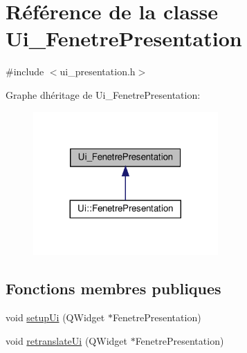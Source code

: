 \hypertarget{class_ui___fenetre_presentation}{}\section{Référence de la classe Ui\+\_\+\+Fenetre\+Presentation}
\label{class_ui___fenetre_presentation}


{\ttfamily \#include $<$ui\+\_\+presentation.\+h$>$}



Graphe d\textquotesingle{}héritage de Ui\+\_\+\+Fenetre\+Presentation\+:
\nopagebreak
\begin{figure}[H]
\begin{center}
\leavevmode
\includegraphics[width=200pt]{class_ui___fenetre_presentation__inherit__graph}
\end{center}
\end{figure}
\subsection*{Fonctions membres publiques}
\begin{DoxyCompactItemize}
\item 
void \hyperlink{class_ui___fenetre_presentation_a08e799fcf97f8afe980e76770b4ef960}{setup\+Ui} (Q\+Widget $\ast$Fenetre\+Presentation)
\item 
void \hyperlink{class_ui___fenetre_presentation_a14a00db87b3b4ce5a1e3df9f754e19bb}{retranslate\+Ui} (Q\+Widget $\ast$Fenetre\+Presentation)
\end{DoxyCompactItemize}
